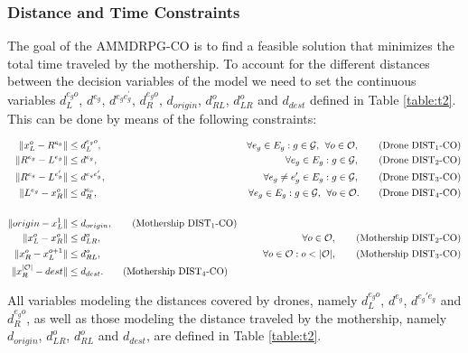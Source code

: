 \documentclass[10pt,a4paper]{elsarticle}
\def\AMDCO{{\sf AMMDRPG-CO\xspace}}
\begin{document}
\subsubsection*{Distance and Time Constraints}
\noindent
The goal of the \AMDCO\xspace is to find a feasible solution that minimizes the total time traveled by the mothership. To account for the different distances between the decision variables of the model we need to set the continuous variables $d_L^{e_go}$, $d^{e_g}$, $d^{e_ge^\prime_g}$, $d_R^{e_go}$, $d_{origin}$, $d_{RL}^o$, $d_{LR}^o$ and $d_{dest}$ defined in Table \ref{table:t2}. This can be done by means of the following constraints:

\begin{align*}
\|x_L^o- R^{e_g}\| & \leq  d_L^{e_go},  &\forall e_g\in E_g:g\in \mathcal{G}, \:\:\forall o\in \mathcal O, \tag{Drone DIST$_{1}$-CO} \label{eq:drone-d1-async-CO}\\
\|R^{e_g}- L^{e_g}\| & \leq  d^{e_g},  &\forall e_g\in E_g:g\in \mathcal{G}, \tag{Drone DIST$_{2}$-CO} \label{eq:drone-d2-async-CO}\\
\|R^{e_g}- L^{e'_g}\| & \leq  d^{e_ge'_g}, &\forall e_g\neq e_g'\in E_g:g\in \mathcal{G}, \tag{Drone DIST$_{3}$-CO} \label{eq:drone-d3-async-CO}\\
\|L^{e_g}- x_R^o\| & \leq  d_R^{e_o}, &\forall e_g\in E_g:g\in \mathcal{G},\:\:\forall o\in \mathcal O. \tag{Drone DIST$_{4}$-CO} \label{eq:drone-d4-async-CO}\\\\
\|origin - x_L^1\| & \leq d_{origin}, \tag{Mothership DIST$_1$-CO}\label{eq:mothership-d1-async-CO}\\
\|x_L^o - x_R^{o}\| & \leq d_{LR}^{o}, &\forall o\in\mathcal O, \tag{Mothership DIST$_{2}$-CO}\label{eq:mothership-d3-async-CO}\\
\|x_R^o - x_L^{o+1}\| & \leq d_{RL}^{o}, &\forall o\in\mathcal O:o<|\mathcal O|, \tag{Mothership DIST$_{3}$-CO}\label{eq:mothership-d4-async-CO}\\
\|x_R^{|\mathcal O|} - dest\| & \leq d_{dest}. \tag{Mothership DIST$_4$-CO}\label{eq:mothership-d6-async-CO}
\end{align*}

\noindent
All variables modeling the distances covered by drones, namely $d_L^{e_go}$, $d^{e_g}$, $d^{e_g'e_g}$ and $d_R^{e_go}$,  as well as those modeling the distance traveled by the mothership, namely $d_{origin}$, $d_{LR}^o$, $d_{RL}^o$ and $d_{dest}$, are defined in Table \ref{table:t2}. 
\end{document}
